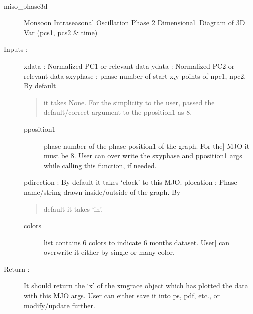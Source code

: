 \documentclass[letterpaper,10pt,english]{sphinxmanual}
\begin{document}
\begin{fulllineitems}
\label{mjo:phase3d.miso_phase3d}~\begin{description}
\item[{miso\_phase3d}] \leavevmode{[}Monsoon Intraseasonal Oscillation Phase 2 Dimensional{]}
Diagram of 3D Var (pcs1, pcs2 \& time)

\item[{Inputs :}] \leavevmode
xdata : Normalized PC1 or relevant data
ydata : Normalized PC2 or relevant data
sxyphase : phase number of start x,y points of npc1, npc2. By default
\begin{quote}

it takes None. For the simplicity to the user, passed the
default/correct argument to the pposition1 as 8.
\end{quote}
\begin{description}
\item[{pposition1}] \leavevmode{[}phase number of the phase position1 of the graph. For the{]}
MJO it must be 8. User can over write the sxyphase and
pposition1 args while calling this function, if needed.

\end{description}

pdirection : By default it takes `clock' to this MJO.
plocation : Phase name/string drawn inside/outside of the graph. By
\begin{quote}

default it takes `in'.
\end{quote}
\begin{description}
\item[{colors}] \leavevmode{[}list contains 6 colors to indicate 6 months dataset. User{]}
can overwrite it either by single or many color.

\end{description}

\item[{Return :}] \leavevmode
It should return the `x' of the xmgrace object which has plotted the
data with this MJO args. User can either save it into ps, pdf, etc.,
or modify/update further.


\end{description}
\end{fulllineitems}
\end{document}

